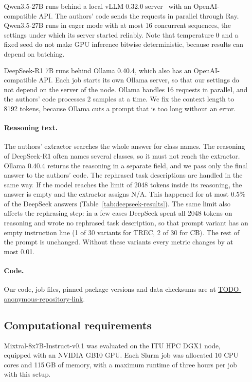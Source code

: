 \par\medskip

Qwen3.5-27B runs behind a local vLLM 0.32.0
server~\cite{Kwon:2023} with an OpenAI-compatible API. The authors' code sends
the requests in parallel through Ray. Qwen3.5-27B runs in eager mode with at
most 16 concurrent sequences, the settings under which its server started
reliably. Note that temperature 0 and a fixed seed do not make GPU inference
bitwise deterministic, because results can depend on batching.

\par\medskip

DeepSeek-R1 7B runs behind Ollama 0.40.4, which also has an OpenAI-compatible
API. Each job starts its own Ollama server, so that our settings do not depend
on the server of the node. Ollama handles 16 requests in parallel, and the
authors' code processes 2 samples at a time. We fix the context length to 8192
tokens, because Ollama cuts a prompt that is too long without an error.

\paragraph{Reasoning text.} The authors' extractor searches the whole answer
for class names. The reasoning of DeepSeek-R1 often names several classes, so
it must not reach the extractor. Ollama 0.40.4 returns the reasoning in a
separate field, and we pass only the final answer to the authors' code. The
rephrased task descriptions are handled in the same way. If the model reaches
the limit of 2048 tokens inside its reasoning, the answer is empty and the
extractor assigns N/A. This happened for at most 0.5\% of the DeepSeek
answers (Table~\ref{tab:deepseek-results}). The same limit also affects the
rephrasing step: in a few cases DeepSeek spent all 2048 tokens on reasoning and
wrote no rephrased task description, so that prompt variant has an empty
instruction line (1 of 30 variants for TREC, 2 of 30 for CB). The rest of the
prompt is unchanged. Without these variants every metric changes by at most
0.01.

\paragraph{Code.} Our code, job files, pinned package versions and data
checksums are at \url{TODO-anonymous-repository-link}.

\subsection{Computational requirements}
\label{sec:compute}
Mixtral-8x7B-Instruct-v0.1 was evaluated on the ITU HPC
DGX1 node, equipped with an NVIDIA GB10 GPU.
Each Slurm job was allocated 10 CPU cores and
115\,GB of memory, with a maximum runtime of
three hours per job with this setup. 

